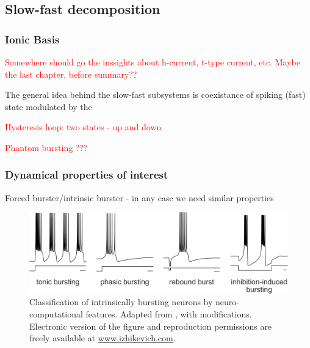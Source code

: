 \documentclass[../main.tex]{subfiles}
\begin{document}
\subsection{Slow-fast decomposition}

\subsubsection{Ionic Basis}

\textcolor{red}{
    Somewhere should go the inssights about h-current, t-type current, etc.
    Maybe the last chapter, before summary??
}

The general idea behind the slow-fast subsystems is coexistance of spiking (fast) state
modulated by the 


\textcolor{red}{Hysteresis loop: two states - up and down}

\textcolor{red}{Phantom bursting ???}

\subsubsection{Dynamical properties of interest}

\color{red}
Forced burster/intrinsic burster - in any case we need similar properties
\color{black}

\begin{figure}[!b]
    \centering
    \includegraphics[width=0.85\linewidth]{../img/modelling_r5/examples/classification_of_intrinsic_bursters.png}
    \caption[Classification of intrinsically bursting neurons by neuro-computational features]{
        Classification of intrinsically bursting neurons by neuro-computational features.
        Adapted from \cite{izhikevichDynamicalSystemsNeuroscience2006}, with modifications.
        Electronic version of the figure and reproduction permissions
        are freely available at \url{www.izhikevich.com}.
    }
    \label{fig:classification_intrin_burst}
\end{figure}
\end{document}
